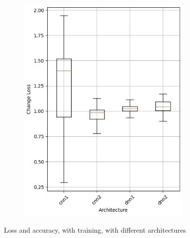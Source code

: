 \begin{figure}
\begin{subfigure}{0.5\textwidth}
        \includegraphics[width=0.95\textwidth]{plots/Architecture_Trained_loss.png}
    \end{subfigure}
    \caption{Loss and accuracy, with training, with different architectures}
    \label{fig:architecture-training}
\end{figure}
